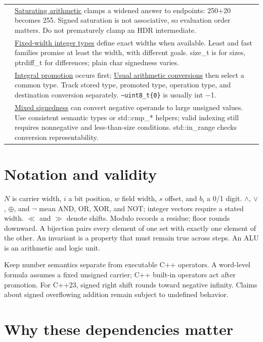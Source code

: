 {\begin{longtable}[]{@{}
  >{\raggedright\arraybackslash}p{}
  >{\raggedright\arraybackslash}p{}@{}}
37 & \hyperref[appendix-3999c6209649]{Saturating arithmetic} clamps a widened answer to endpoints: 250+20 becomes 255. Signed saturation is not associative, so evaluation order matters. Do not prematurely clamp an HDR intermediate. \\
38 & \hyperref[appendix-cc04044b5782]{Fixed-width integer types} define exact widths when available. Least and fast families promise at least the width, with different goals. size\_t is for sizes, ptrdiff\_t for differences; plain char signedness varies. \\
39 & \hyperref[appendix-45303d03796a]{Integral promotion} occurs first; \hyperref[appendix-5e2d663adf7f]{Usual arithmetic conversions} then select a common type. Track stored type, promoted type, operation type, and destination conversion separately. \texttt{\textasciitilde{}uint8\_t\{0\}} is usually int −1. \\
40 & \hyperref[appendix-736a2345de4a]{Mixed signedness} can convert negative operands to large unsigned values. Use consistent semantic types or std::cmp\_* helpers; valid indexing still requires nonnegative and less-than-size conditions. std::in\_range checks conversion representability. \\
\end{longtable}
}

\section{Notation and validity}\label{appendix-fd090d982a15-notation-and-validity}

\(N\) is carrier width, \(i\) a bit position, \(w\) field width, \(s\) offset, and \(b_i\) a 0/1 digit. \(\land\), \(\lor\), \(\oplus\), and \(\neg\) mean AND, OR, XOR, and NOT; integer vectors require a stated width. \(\ll\) and \(\gg\) denote shifts. Modulo records a residue; floor rounds downward. A bijection pairs every element of one set with exactly one element of the other. An invariant is a property that must remain true across steps. An ALU is an arithmetic and logic unit.

Keep number semantics separate from executable C++ operators. A word-level formula assumes a fixed unsigned carrier; C++ built-in operators act after promotion. For C++23, signed right shift rounds toward negative infinity. Claims about signed overflowing addition remain subject to undefined behavior.

\section{Why these dependencies matter}\label{appendix-fd090d982a15-why-these-dependencies-matter}

